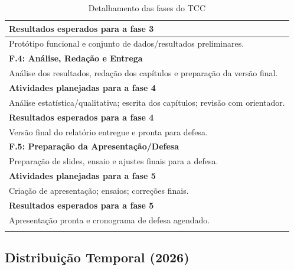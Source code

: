 \begin{longtable}{p{\textwidth}}
\midrule
\myrowcolour%
\bfseries Resultados esperados para a fase 3 \\
\midrule
Protótipo funcional e conjunto de dados/resultados preliminares.\\
\toprule%
\myrowcolour%
\bfseries F.4: Análise, Redação e Entrega \\
\midrule
Análise dos resultados, redação dos capítulos e preparação da versão final. \\
\midrule
\myrowcolour%
\bfseries Atividades planejadas para a fase 4 \\
\midrule
Análise estatística/qualitativa; escrita dos capítulos; revisão com orientador. \\
\midrule
\myrowcolour%
\bfseries Resultados esperados para a fase 4 \\
\midrule
Versão final do relatório entregue e pronta para defesa.\\
\toprule%
\myrowcolour%
\bfseries F.5: Preparação da Apresentação/Defesa \\
\midrule
Preparação de slides, ensaio e ajustes finais para a defesa. \\
\midrule
\myrowcolour%
\bfseries Atividades planejadas para a fase 5 \\
\midrule
Criação de apresentação; ensaios; correções finais. \\
\midrule
\myrowcolour%
\bfseries Resultados esperados para a fase 5 \\
\midrule
Apresentação pronta e cronograma de defesa agendado.\\
\bottomrule
\caption{Detalhamento das fases do TCC}
\label{tab:fases}
\end{longtable}

\subsection*{Distribuição Temporal (2026)}

